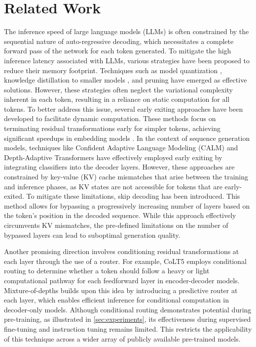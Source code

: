 \section{Related Work} \label{sec:related}

The inference speed of large language models (LLMs) is often constrained by the sequential nature of auto-regressive decoding, which necessitates a complete forward pass of the network for each token generated. To mitigate the high inference latency associated with LLMs, various strategies have been proposed to reduce their memory footprint. Techniques such as model quantization \cite{frantar2022gptq,yao2022zeroquant,dettmers2023spqr}, knowledge distillation to smaller models \cite{gu2023knowledge,agarwal2023gkd}, and pruning \cite{frantar2023sparsegpt,sun2023simple} have emerged as effective solutions. However, these strategies often neglect the variational complexity inherent in each token, resulting in a reliance on static computation for all tokens. To better address this issue, several early exiting approaches have been developed to facilitate dynamic computation. These methods focus on terminating residual transformations early for simpler tokens, achieving significant speedups in embedding models \cite{xin2020deepspeed,hou2020dynabert,varshney2022model}.
In the context of sequence generation models, techniques like Confident Adaptive Language Modeling (CALM) \cite{schuster2022confident} and Depth-Adaptive Transformers \cite{elbayad2020depthadaptive} have effectively employed early exiting by integrating classifiers into the decoder layers. However, these approaches are constrained by key-value (KV) cache mismatches that arise between the training and inference phases, as KV states are not accessible for tokens that are early-exited. To mitigate these limitations, skip decoding \cite{delcorro2023skipdecode} has been introduced. This method allows for bypassing a progressively increasing number of layers based on the token’s position in the decoded sequence. While this approach effectively circumvents KV mismatches, the pre-defined limitations on the number of bypassed layers can lead to suboptimal generation quality.

Another promising direction involves conditioning residual transformations at each layer through the use of a router. For example, CoLT5 \cite{ainslie2023colt5} employs conditional routing to determine whether a token should follow a heavy or light computational pathway for each feedforward layer in encoder-decoder models. Mixture-of-depths \cite{raposo2024mixture} builds upon this idea by introducing a predictive router at each layer, which enables efficient inference for conditional computation in decoder-only models. Although conditional routing demonstrates potential during pre-training, as illustrated in \cref{sec:experiments}, its effectiveness during supervised fine-tuning and instruction tuning remains limited. This restricts the applicability of this technique across a wider array of publicly available pre-trained models.

